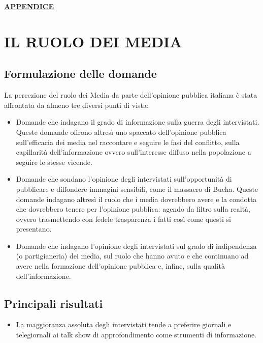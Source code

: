 \documentclass[
  openany]{book}
\providecommand{\tightlist}{%
  \setlength{\itemsep}{0pt}\setlength{\parskip}{0pt}}
\begin{document}
\href{https://github.com/LucianaFazio/Ucrania/blob/main/PDF_Appendice/VII.\%20Il\%20clima\%20di\%20opinione\%20v.3.pdf}{\textbf{APPENDICE}}

\hypertarget{il-ruolo-dei-media}{%
\chapter{IL RUOLO DEI MEDIA}\label{il-ruolo-dei-media}}

\hypertarget{formulazione-delle-domande-6}{%
\section{Formulazione delle domande}\label{formulazione-delle-domande-6}}

La percezione del ruolo dei Media da parte dell'opinione pubblica italiana è stata affrontata da almeno tre diversi punti di vista:

\begin{itemize}
\item
  Domande che indagano il grado di informazione sulla guerra degli intervistati. Queste domande offrono altresì uno spaccato dell'opinione pubblica sull'efficacia dei media nel raccontare e seguire le fasi del conflitto, sulla capillarità dell'informazione ovvero sull'interesse diffuso nella popolazione a seguire le stesse vicende.
\item
  Domande che sondano l'opinione degli intervistati sull'opportunità di pubblicare e diffondere immagini sensibili, come il massacro di Bucha. Queste domande indagano altresì il ruolo che i media dovrebbero avere e la condotta che dovrebbero tenere per l'opinione pubblica: agendo da filtro sulla realtà, ovvero trasmettendo con fedele trasparenza i fatti così come questi si presentano.
\item
  Domande che indagano l'opinione degli intervistati sul grado di indipendenza (o partigianeria) dei media, sul ruolo che hanno avuto e che continuano ad avere nella formazione dell'opinione pubblica e, infine, sulla qualità dell'informazione.
\end{itemize}

\hypertarget{principali-risultati-6}{%
\section{Principali risultati}\label{principali-risultati-6}}

\begin{itemize}
\tightlist
\item
  La maggioranza assoluta degli intervistati tende a preferire giornali e telegiornali ai talk show di approfondimento come strumenti di informazione.
\end{itemize}
\end{document}
